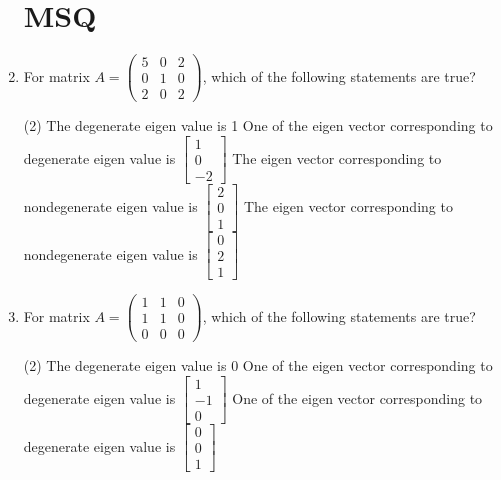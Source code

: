 \begin{enumerate}
       \section{MSQ}  
 \item For matrix $A=\left(\begin{array}{lll}5 & 0 & 2 \\ 0 & 1 & 0 \\ 2 & 0 & 2\end{array}\right)$, which of the following statements are true?
                 \begin{tasks}(2)
                	\task[\textbf{a.}]The degenerate eigen value is 1
                	\task[\textbf{b.}]One of the eigen vector corresponding to degenerate eigen value is $\left[\begin{array}{c}1 \\ 0 \\ -2\end{array}\right]$
                	\task[\textbf{c.}]The eigen vector corresponding to nondegenerate eigen value is $\left[\begin{array}{l}2 \\ 0 \\ 1\end{array}\right]$
                	\task[\textbf{d.}] The eigen vector corresponding to nondegenerate eigen value is $\left[\begin{array}{l}0 \\ 2 \\ 1\end{array}\right]$   
                \end{tasks}
 \item   For matrix $A=\left(\begin{array}{lll}1 & 1 & 0 \\ 1 & 1 & 0 \\ 0 & 0 & 0\end{array}\right)$, which of the following statements are true?    
                 \begin{tasks}(2)
                	\task[\textbf{a.}]The degenerate eigen value is 0
                	\task[\textbf{b.}]One of the eigen vector corresponding to degenerate eigen value is $\left[\begin{array}{c}1 \\ -1 \\ 0\end{array}\right]$
                	\task[\textbf{c.}]One of the eigen vector corresponding to degenerate eigen value is $\left[\begin{array}{l}0 \\ 0 \\ 1\end{array}\right]$

\end{tasks}
\end{enumerate}

